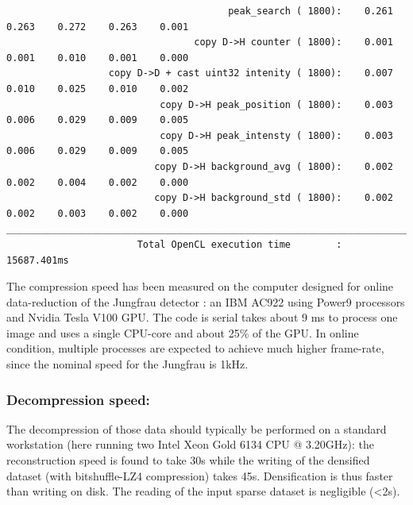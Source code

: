 \documentclass[preprint]{iucr}              %
\begin{document}
\begin{verbatim}
                                       peak_search ( 1800):    0.261    0.263    0.272    0.263    0.001
                                 copy D->H counter ( 1800):    0.001    0.001    0.010    0.001    0.000
                  copy D->D + cast uint32 intenity ( 1800):    0.007    0.010    0.025    0.010    0.002
                           copy D->H peak_position ( 1800):    0.003    0.006    0.029    0.009    0.005
                           copy D->H peak_intensty ( 1800):    0.003    0.006    0.029    0.009    0.005
                          copy D->H background_avg ( 1800):    0.002    0.002    0.004    0.002    0.000
                          copy D->H background_std ( 1800):    0.002    0.002    0.003    0.002    0.000
________________________________________________________________________________
                       Total OpenCL execution time        : 15687.401ms

\end{verbatim}

The compression speed has been measured on the computer designed for online data-reduction of the Jungfrau detector \cite{sri2021}: 
an IBM AC922 using Power9 processors and Nvidia Tesla V100 GPU. 
The code is serial takes about 9 ms to process one image and uses a single CPU-core and about 25\% of the GPU. 
In online condition, multiple processes are expected to achieve much higher frame-rate, since the nominal speed for the Jungfrau is 1kHz.

\subsubsection{Decompression speed:} 
The decompression of those data should typically be performed on a standard workstation (here running two Intel Xeon Gold 6134 CPU @ 3.20GHz): the reconstruction speed is found to take 30s while the writing of the densified dataset (with bitshuffle-LZ4 compression) takes 45s. 
Densification is thus faster than writing on disk.
The reading of the input sparse dataset is negligible (<2s).
\end{document}
